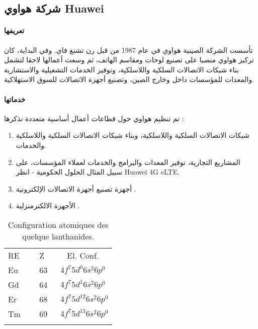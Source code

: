 \subsection{ شركة هواوي Huawei }

\paragraph{تعريفها}
تأسست الشركة الصينية هواوي في عام 1987 من قبل رن تشنغ فاي. وفي البداية، كان تركيز هواوي منصبا على تصنيع لوحات ومقاسم الهاتف، ثم وسعت أعمالها لاحقا لتشمل بناء شبكات الاتصالات السلكية واللاسلكية، وتوفير الخدمات التشغيلية والاستشارية   والمعدات للمؤسسات داخل وخارج الصين، وتصنيع أجهزة الاتصالات للسوق الاستهلاكية.

\paragraph{خدماتها}
تم تنظيم هواوي حول قطاعات أعمال أساسية متعددة نذكرها :
\begin{enumerate}
	\item
	شبكات الاتصالات السلكية واللاسلكية، وبناء شبكات الاتصالات السلكية واللاسلكية والخدمات.
	\item
	المشاريع التجارية، توفير المعدات والبرامج والخدمات لعملاء المؤسسات، على سبيل المثال الحلول الحكومية - انظر Huawei 4G eLTE.
	\item
	أجهزة تصنيع أجهزة الاتصالات الإلكترونية .
	\item
	الأجهزة الالكترمنزلية .
\end{enumerate}



\begin{table}
	\centering
	\begin{tabular}{lll}
		\hline\noalign{\smallskip}
		 RE &~~ Z~~ &~ El. Conf. \\
		\noalign{\smallskip}\hline\noalign{\smallskip}
	Eu &~~ 63~ & $ 4f^{7} 5d^{0} 6s^{2} 6p^{0} $ \\
	Gd &~~ 64~ & $ 4f^{7} 5d^{1} 6s^{2} 6p^{0} $  \\
	Er &~~ 68~ & $ 4f^{7} 5d^{12} 6s^{2} 6p^{0} $ \\
	Tm &~~ 69~ & $ 4f^{7} 5d^{13} 6s^{2} 6p^{0} $\\
		\noalign{\smallskip}\hline
	\end{tabular}
\caption{Configuration atomiques des quelque lanthanides.}
\label{tab:1}
\end{table}
